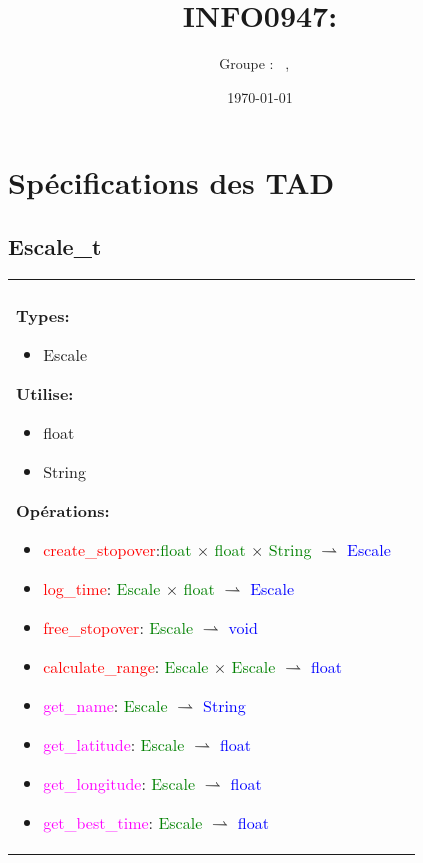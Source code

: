\documentclass[a4paper, 11pt, oneside]{article}
\title{INFO0947: \intitule}
\author{Groupe \GrNbr : \PrenomUN~\textsc{\NomUN}, \PrenomDEUX~\textsc{\NomDEUX}}
\date{\today}
\newcommand{\tablemat}{~}
\renewcommand{\tablemat}{\tableofcontents}
\begin{document}
\maketitle
\newpage
\tablemat
\newpage

\section{Spécifications des TAD}
	
	\subsection{Escale\_t}
		\begin{tabular}{|p{17cm}|c}
			\hline
			\\
			
			\textbf{Types:}
				\begin{itemize}
					\item[] Escale
				\end{itemize}
			
			\textbf{Utilise:}
				\begin{itemize}
					\item[] float
					\item[] String
				\end{itemize}
			
			\textbf{Opérations\footnotemark{}:}
				\begin{itemize}
					\item[] \textcolor{red}{create\_stopover}:\textcolor{green}{float} $\times$ \textcolor{green}{float} $\times$ \textcolor{green}{String} $\rightharpoonup$ \textcolor{blue}{Escale}
					\item[] \textcolor{red}{log\_time}: \textcolor{green}{Escale} $\times$ \textcolor{green}{float} $\rightharpoonup$ \textcolor{blue}{Escale}
					\item[] \textcolor{red}{free\_stopover}: \textcolor{green}{Escale} $\rightharpoonup$ \textcolor{blue}{void}
					\item[] \textcolor{red}{calculate\_range}: \textcolor{green}{Escale} $\times$ \textcolor{green}{Escale} $\rightharpoonup$ \textcolor{blue}{float}
					\item[] \textcolor{magenta}{get\_name}: \textcolor{green}{Escale} $\rightharpoonup$ \textcolor{blue}{String}
					\item[] \textcolor{magenta}{get\_latitude}: \textcolor{green}{Escale} $\rightharpoonup$ \textcolor{blue}{float}
					\item[] \textcolor{magenta}{get\_longitude}: \textcolor{green}{Escale} $\rightharpoonup$ \textcolor{blue}{float}
					\item[] \textcolor{magenta}{get\_best\_time}: \textcolor{green}{Escale} $\rightharpoonup$ \textcolor{blue}{float}
				\end{itemize}
			

\end{tabular}
\end{document}
